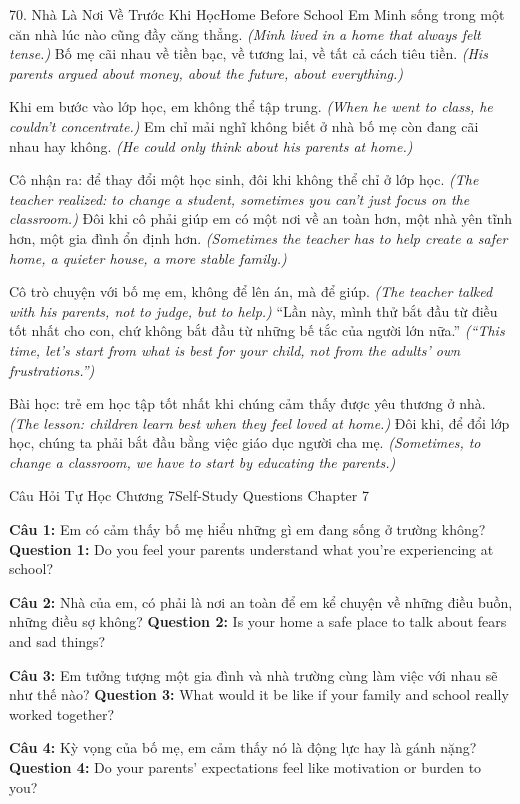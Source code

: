 \begin{truyen}{70. Nhà Là Nơi Về Trước Khi Học}{Home Before School}
Em Minh sống trong một căn nhà lúc nào cũng đầy căng thẳng.
\textit{(Minh lived in a home that always felt tense.)}
Bố mẹ cãi nhau về tiền bạc, về tương lai, về tất cả cách tiêu tiền.
\textit{(His parents argued about money, about the future, about everything.)}

Khi em bước vào lớp học, em không thể tập trung.
\textit{(When he went to class, he couldn't concentrate.)}
Em chỉ mải nghĩ không biết ở nhà bố mẹ còn đang cãi nhau hay không.
\textit{(He could only think about his parents at home.)}

Cô nhận ra: để thay đổi một học sinh, đôi khi không thể chỉ ở lớp học.
\textit{(The teacher realized: to change a student, sometimes you can't just focus on the classroom.)}
Đôi khi cô phải giúp em có một nơi về an toàn hơn, một nhà yên tĩnh hơn, một gia đình ổn định hơn.
\textit{(Sometimes the teacher has to help create a safer home, a quieter house, a more stable family.)}

Cô trò chuyện với bố mẹ em, không để lên án, mà để giúp.
\textit{(The teacher talked with his parents, not to judge, but to help.)}
``Lần này, mình thử bắt đầu từ điều tốt nhất cho con, chứ không bắt đầu từ những bế tắc của người lớn nữa.''
\textit{(``This time, let's start from what is best for your child, not from the adults' own frustrations.'')}

Bài học: trẻ em học tập tốt nhất khi chúng cảm thấy được yêu thương ở nhà.
\textit{(The lesson: children learn best when they feel loved at home.)}
Đôi khi, để đổi lớp học, chúng ta phải bắt đầu bằng việc giáo dục người cha mẹ.
\textit{(Sometimes, to change a classroom, we have to start by educating the parents.)}
\end{truyen}

\begin{tuhocnhanh}{Câu Hỏi Tự Học Chương 7}{Self-Study Questions Chapter 7}

\textbf{Câu 1:} Em có cảm thấy bố mẹ hiểu những gì em đang sống ở trường không?
\textbf{Question 1:} Do you feel your parents understand what you're experiencing at school?

\textbf{Câu 2:} Nhà của em, có phải là nơi an toàn để em kể chuyện về những điều buồn, những điều sợ không?
\textbf{Question 2:} Is your home a safe place to talk about fears and sad things?

\textbf{Câu 3:} Em tưởng tượng một gia đình và nhà trường cùng làm việc với nhau sẽ như thế nào?
\textbf{Question 3:} What would it be like if your family and school really worked together?

\textbf{Câu 4:} Kỳ vọng của bố mẹ, em cảm thấy nó là động lực hay là gánh nặng?
\textbf{Question 4:} Do your parents' expectations feel like motivation or burden to you?

\end{tuhocnhanh}

\ngancach
